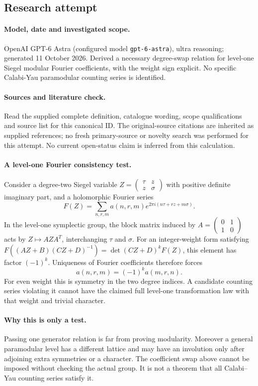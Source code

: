 \documentclass[11pt]{article}
\begin{document}
\subsection{Research attempt}
\paragraph{Model, date and investigated scope.}
OpenAI GPT-6 Astra (configured model \texttt{gpt-6-astra}), ultra reasoning; generated 11 October 2026. Derived a necessary degree-swap relation for level-one Siegel modular Fourier coefficients, with the weight sign explicit. No specific Calabi-Yau paramodular counting series is identified.

\paragraph{Sources and literature check.}
Read the supplied complete definition, catalogue wording, scope qualifications and source list for this canonical ID. The original-source citations are inherited as supplied references; no fresh primary-source or novelty search was performed for this attempt. No current open-status claim is inferred from this calculation.

\paragraph{A level-one Fourier consistency test.}Consider a degree-two Siegel variable \(Z=\begin{pmatrix}\tau&z\\z&\sigma\end{pmatrix}\) with positive definite imaginary part, and a holomorphic Fourier series
\[F(Z)=\sum_{n,r,m}a(n,r,m)e^{2\pi i(n\tau+rz+m\sigma)}.
\]
In the level-one symplectic group, the block matrix induced by \(A=\begin{pmatrix}0&1\\1&0\end{pmatrix}\) acts by \(Z\mapsto AZA^T\), interchanging \(\tau\) and \(\sigma\). For an integer-weight form satisfying \(F((AZ+B)(CZ+D)^{-1})=\det(CZ+D)^kF(Z)\), this element has factor \((-1)^k\). Uniqueness of Fourier coefficients therefore forces
\[a(n,r,m)=(-1)^k a(m,r,n).
\]
For even weight this is symmetry in the two degree indices. A candidate counting series violating it cannot have the claimed full level-one transformation law with that weight and trivial character.
\paragraph{Why this is only a test.}Passing one generator relation is far from proving modularity. Moreover a general paramodular level has a different lattice and may have an involution only after adjoining extra symmetries or a character. The coefficient swap above cannot be imposed without checking the actual group. It is not a theorem that all Calabi--Yau counting series satisfy it.
\end{document}
